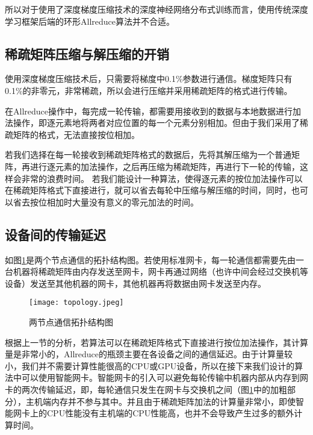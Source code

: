   所以对于使用了深度梯度压缩技术的深度神经网络分布式训练而言，使用传统深度学习框架后端的环形Allreduce算法并不合适。

\subsection{稀疏矩阵压缩与解压缩的开销}
使用深度梯度压缩技术后，只需要将梯度中0.1\%参数进行通信。梯度矩阵只有0.1\%的非零元，非常稀疏，所以会进行压缩并采用稀疏矩阵的格式进行传输。

在Allreduce操作中，每完成一轮传输，都需要用接收到的数据与本地数据进行加法操作，即逐元素地将两者对应位置的每一个元素分别相加。但由于我们采用了稀疏矩阵的格式，无法直接按位相加。

若我们选择在每一轮接收到稀疏矩阵格式的数据后，先将其解压缩为一个普通矩阵，再进行逐元素的加法操作，之后再压缩为稀疏矩阵，再进行下一轮的传输，这样会非常的浪费时间。
若我们能设计一种算法，使得逐元素的按位加法操作可以在稀疏矩阵格式下直接进行，就可以省去每轮中压缩与解压缩的时间，同时，也可以省去按位相加时大量没有意义的零元加法的时间。

\subsection{设备间的传输延迟}
如图\ref{fig:topology}是两个节点通信的拓扑结构图。若使用标准网卡，每一轮通信都需要先由一台机器将稀疏矩阵由内存发送至网卡，网卡再通过网络（也许中间会经过交换机等设备）发送至其他机器的网卡，其他机器再将数据由网卡发送至内存。

\begin{figure}[ht] %
  \centering
  \texttt{[image: topology.jpeg]}
  \caption{两节点通信拓扑结构图}
  \label{fig:topology}
\end{figure}

根据上一节的分析，若算法可以在稀疏矩阵格式下直接进行按位加法操作，其计算量是非常小的，Allreduce的瓶颈主要在各设备之间的通信延迟。由于计算量较小，我们并不需要计算性能很高的CPU或GPU设备，所以在接下来我们设计的算法中可以使用智能网卡。智能网卡的引入可以避免每轮传输中机器内部从内存到网卡的两次传输延迟，即，每轮通信只发生在网卡与交换机之间（图\ref{fig:topology}中的加粗部分），主机端内存并不参与其中。并且由于稀疏矩阵加法的计算量非常小，即使智能网卡上的CPU性能没有主机端的CPU性能高，也并不会导致产生过多的额外计算时间。

